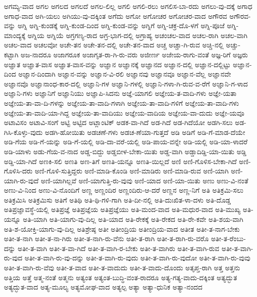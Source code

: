 {ಅಗಮ್ಯ-ವಾದ
ಅಗಲ
ಅಗಲದ
ಅಗಲದೆ
ಅಗಲ-ಲಿಲ್ಲ
ಅಗಲಿ
ಅಗಲಿ-ರಲು
ಅಗಲಿಸ-ಬಾ-ರದು
ಅಗಲು-ವು-ದಕ್ಕೆ
ಅಗಾಧ
ಅಗಾಧ-ವಾದ
ಅಗಿ-ಯಲು
ಅಗಿಯು-ವು-ದಕ್ಕಿಂತ
ಅಗೆದು
ಅಗೋ
ಅಗೋಚರ
ಅಗೋಚರ-ವಾದ
ಅಗೌರವ
ಅಗೌರವ-ವನ್ನು
ಅಗ್ನಿ
ಅಗ್ನಿ-ಕುಂಡಕ್ಕೆ
ಅಗ್ನಿ-ಕುಂಡ-ದಿಂದ
ಅಗ್ನಿ-ಕುಂಡ-ವನ್ನು
ಅಗ್ನಿಗೆ
ಅಗ್ನಿ-ಚಕ್ರ-ದೊ-ಳಗೆ
ಅಗ್ನಿ-ಪೂಜೆ
ಅಗ್ನಿ-ಮಾಂದ್ಯಕ್ಕೆ
ಅಗ್ನಿಯ
ಅಗ್ನಿಯೆ
ಅಗ್ರಗಣ್ಯ-ರಾದ
ಅಗ್ರ-ಭಾಗ-ದಲ್ಲಿ
ಅಗ್ರಾಹ್ಯ
ಅಚಂಚಲ-ವಾದ
ಅಚಲ-ರಾಗಿ
ಅಚಲ-ವಾಗಿ
ಅಚಲ-ವಾದ
ಅಚಲವೋ
ಅಚೇ-ತನ
ಅಚೇ-ತನ-ದಲ್ಲಿ
ಅಚೇ-ತನ-ವಾದ
ಅಚ್ಚ
ಅಚ್ಚಾ-ಗಿ-ರುವ
ಅಚ್ಚಿ-ನಲ್ಲಿ
ಅಚ್ಚು-ಕಟ್ಟಾಗಿ
ಅಜ-ನಾದರೂ
ಅಜಾಗರೂಕ
ಅಜಾಗೃತ-ರಾ-ಗಿ-ರು-ವರು
ಅಜೀರ್ಣ
ಅಜೇಯ-ರಾಗು-ವಂತೆ
ಅಜ್ಞ-ರಿಗೆ
ಅಜ್ಞರು
ಅಜ್ಞಾತ
ಅಜ್ಞಾತ-ವಾಸ
ಅಜ್ಞಾತ-ವಾಸ-ವನ್ನು
ಅಜ್ಞಾನ
ಅಜ್ಞಾನಕ್ಕೆ
ಅಜ್ಞಾನದ
ಅಜ್ಞಾನ-ದಲ್ಲಿ
ಅಜ್ಞಾನ-ದಲ್ಲಿಟ್ಟು
ಅಜ್ಞಾನ-ದಿಂದ
ಅಜ್ಞಾನ-ದಿಂದಾಗಿ
ಅಜ್ಞಾನ-ವನ್ನು
ಅಜ್ಞಾನ-ವಿ-ರಲಿ
ಅಜ್ಞಾನವು
ಅಜ್ಞಾನವೂ
ಅಜ್ಞಾನ-ವೆಲ್ಲ
ಅಜ್ಞಾನವೇ
ಅಜ್ಞಾನವೊ
ಅಜ್ಞಾನಾಂಧ-ಕಾರ-ದಲ್ಲಿ
ಅಜ್ಞಾನಿ-ಗಳ
ಅಜ್ಞಾನಿ-ಗಳಲ್ಲಿ
ಅಜ್ಞಾನಿ-ಗಳಾ-ಗಿ-ರುವ-ವ-ರೆಗೆ
ಅಜ್ಞಾನಿ-ಗ-ಳಾದ
ಅಜ್ಞಾನಿ-ಗಳು
ಅಜ್ಞಾನಿಗೆ
ಅಜ್ಞಾನಿಯು
ಅಜ್ಞಾಪಿ-ಸಿದನು
ಅಜ್ಞೆ-ಯಾಗಲಿ
ಅಜ್ಞೇಯ-ತ-ವಾದಿ-ಗಳು
ಅಜ್ಞೇ-ಯತಾ
ಅಜ್ಞೇಯ-ತಾ-ವಾ-ದಿ-ಗಳನ್ನು
ಅಜ್ಞೇಯ-ತಾ-ವಾದಿ-ಗಳಾಗಿ
ಅಜ್ಞೇಯ-ತಾ-ವಾದಿ-ಗಳಿಗೆ
ಅಜ್ಞೇಯ-ತಾ-ವಾದಿ-ಗಳು
ಅಜ್ಞೇಯ-ತಾ-ವಾದಿ-ಯಾ-ಗಿದ್ದ
ಅಜ್ಞೇಯ-ತಾ-ವಾದಿಯು
ಅಜ್ಞೇಯ-ವಾದಿಯ
ಅಜ್ಞೇಯ-ವಾ-ದುದು
ಅಜ್ಞೇ-ಯವೂ
ಅಟಾವಿಸಂ
ಅಟಾವಿ-ಸಂಗೆ
ಅಟ್ಟಿ
ಅಟ್ಟಿದ
ಅಟ್ಲಾಂಟಿಕ್
ಅಡಕ-ವಾ-ಗಿದೆ
ಅಡ-ಗಿದೆ
ಅಡ-ಗಿದೆಯೋ
ಅಡಗಿ-ಸಲು
ಅಡ-ಗಿಸಿ-ಕೊಳ್ಳು-ವುದು
ಅಡಗಿ-ಹೋಯಿತು
ಅಡಚಣೆ-ಗಳು
ಅಡಚ-ಣೆಯಾ-ಗುತ್ತದೆ
ಅಡಿ
ಅಡಿಗೆ
ಅಡಿ-ಗೆ-ಮಾಡ-ದೆಯೇ
ಅಡಿ-ಗೆಯ
ಅಡಿ-ಗೆ-ಯನ್ನು
ಅಡಿ-ಗೆ-ಯಲ್ಲಿ
ಅಡಿ-ದಾ-ವರೆ-ಯಲ್ಲಿ
ಅಡಿ-ಪಾಯ-ವನ್ನೇ
ಅಡಿ-ಯಲ್ಲಿ
ಅಡಿ-ಯಾ-ಳಾದರೆ
ಅಡಿ-ಯಾಳು
ಅಡು-ಗೆಯ-ವ-ನಾದ
ಅಡ್ಡ-ಬಿದ್ದು
ಅಡ್ಡಬೀಳ-ಬೇಕಾ-ಯಿತು
ಅಡ್ಡ-ವಾಗಿ
ಅಡ್ಡಾದಿಡ್ಡಿ-ಯಾ-ಯಿತು
ಅಡ್ಡಿ
ಅಡ್ಡಿ-ಯಾ-ಗಿದೆ
ಅಣಕಿ-ಸಲಿ
ಅಣತಿ
ಅಣ-ತಿಗೆ
ಅಣತಿ-ಯನ್ನೂ
ಅಣತಿ-ಯಿಲ್ಲದೆ
ಅಣಿ
ಅಣಿ-ಗೊಳಿಸ-ಬೇಕಾ-ಗಿದೆ
ಅಣಿ-ಗೊಳಿಸಿ-ದರು
ಅಣಿ-ಗೊಳಿ-ಸುತ್ತಿದ್ದರು
ಅಣಿ-ಮಾಡಿ-ಕೊಂಡಿ
ಅಣಿ-ಮಾಡಿರು
ಅಣಿ-ಮಾಡಿ-ರುವ
ಅಣಿ-ಯಾಗಿ
ಅಣಿ-ಯಾಗಿ-ರು-ವುದೆ
ಅಣಿ-ಯಾಗಿಲ್ಲವೆ
ಅಣಿ-ಯಾಗುತ್ತಿ-ರು-ವುವು
ಅಣಿ-ಯಾದ
ಅಣಿ-ಯಾ-ಯಿತು
ಅಣು
ಅಣು-ವಿ-ನಂತೆ
ಅಣು-ವಿ-ನಿಂದ
ಅಣು-ವಿ-ನೊಂದಿಗೆ
ಅಣ್ಣ
ಅಣ್ಣಂದಿರ
ಅಣ್ಣಂದಿರು-ಆ-ದರೆ
ಅಣ್ಣನ
ಅಣ್ಣ-ನಿಗೆ
ಅತಿ
ಅತಿಕ್ರಮಿ-ಸಲು
ಅತಿಕ್ರಮಿಸಿ
ಅತಿಕ್ರಮಿಸು
ಅತಿಗೆ
ಅತಿಥಿ
ಅತಿ-ಥಿ-ಗಳಿ-ಗಾಗಿ
ಅತಿ-ದೀ-ನಲ್ಲಿ
ಅತಿ-ದುಃಖಿತ-ಳಾ-ದಳು
ಅತಿ-ದೊಡ್ಡ
ಅತಿಪ್ರಜ್ಞಾವಸ್ಥೆ-ಯಲ್ಲಿ
ಅತಿಪ್ರಜ್ಞೆ
ಅತಿಪ್ರಜ್ಞೆಯ
ಅತಿಪ್ರಜ್ಞೆಯು
ಅತಿ-ಮಂದ-ವಾದ
ಅತಿ-ಮಧುರ-ವಾದ
ಅತಿ-ಮುಖ್ಯ
ಅತಿ-ಯನ್ನೂ
ಅತಿ-ಯಾಗಿ
ಅತಿ-ಯಾಗು-ವು-ದಿಲ್ಲ
ಅತಿ-ಯಾದ
ಅತಿ-ರೇಕಕ್ಕೆ
ಅತಿ-ರೇಕದ
ಅತಿ-ರೇ-ಕವೇ
ಅತಿ-ಶಯ-ವಾಗಿ
ಅತಿ-ಶ-ಯೋಕ್ತಿ-ಯಾಗು-ವು-ದಿಲ್ಲ
ಅತಿಶ್ರೇಷ್ಠ
ಅತೀ
ಅತೀಂದ್ರಿಯ
ಅತೀಂದ್ರಿಯ-ವಾದ
ಅತೀತ
ಅತೀ-ತ-ನಾಗ-ಬೇಕು
ಅತೀ-ತ-ನಾಗಿ
ಅತೀ-ತ-ನಾ-ಗಿರು
ಅತೀ-ತ-ನಾಗಿ-ರು-ವೆನು
ಅತೀ-ತ-ರಾಗಿ
ಅತೀ-ತ-ರಾಗಿ-ರು-ವರೊ
ಅತೀ-ತ-ರೆಂಬು-ದನ್ನು
ಅತೀ-ತ-ವಾಗಿ
ಅತೀ-ತ-ವಾ-ಗಿದೆ
ಅತೀ-ತ-ವಾಗಿ-ರ-ಬೇಕು
ಅತೀ-ತ-ವಾಗಿರು
ಅತೀ-ತ-ವಾಗಿ-ರುವ
ಅತೀ-ತ-ವಾಗಿ-ರು-ವುದ
ಅತೀ-ತ-ವಾಗಿ-ರು-ವು-ದನ್ನು
ಅತೀ-ತ-ವಾಗಿ-ರು-ವುದು
ಅತೀ-ತ-ವಾಗಿ-ರು-ವುದೋ
ಅತೀ-ತ-ವಾಗಿ-ರು-ವುವು
ಅತೀ-ತ-ವಾಗಿ-ರು-ವೆವು
ಅತೀ-ತ-ವಾದ
ಅತೀ-ತ-ವಾದುದು
ಅತೀ-ತ-ವಾದು-ದೊಂದು
ಅತೃಪ್ತ-ರಾಗಿ
ಅತ್ತ
ಅತ್ತನು
ಅತ್ತಿಯ
ಅತ್ತೆ
ಅತ್ಮ-ನಂತೆ
ಅತ್ಮನು
ಅತ್ಯಂತ
ಅತ್ಯಂತ-ಬುದ್ಧಿ-ವಂತ-ರಾದರೂ
ಅತ್ಯ-ಗತ್ಯ-ವಾದು-ದಕ್ಕಿಂತ
ಅತ್ಯದ್ಭುತ
ಅತ್ಯದ್ಭುತ-ವಾದ
ಅತ್ಯ-ಮೂಲ್ಯ
ಅತ್ಯಮೋಘ-ವಾದ
ಅತ್ಯಲ್ಪ
ಅತ್ಯಾ
ಅತ್ಯಾ-ಧುನಿಕ
ಅತ್ಯಾ-ನಂದದ
}
